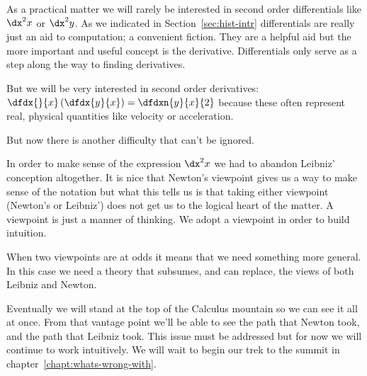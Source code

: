 \begin{Digression}[\foreign{Hic Sunt Dracones} (Here Be Dragons)]



  As a practical matter we will rarely be interested in second order
  differentials like $\dx^2x$ or $\dx^2y$. As we indicated in
  Section~\ref{sec:hist-intr} differentials are really just an aid to
  computation; a convenient fiction. They are a helpful aid but the
  more important and useful concept is the derivative.  Differentials
  only serve as a step along the way to finding derivatives.

  But we will be very interested in second order derivatives:
  $
  \dfdx{}{x}\left(\dfdx{y}{x}\right) = \dfdxn{y}{x}{2}
  $
  because these often represent real, physical quantities like
  velocity or acceleration.
  

  But now there is another difficulty that can't be ignored.

  In order to make sense of the expression $\dx^2{x}$ we had to
  abandon Leibniz' conception altogether. It is nice that Newton's
  viewpoint gives us a way to make sense of the notation but what this
  tells us is that taking either viewpoint (Newton's or Leibniz') does
  not get us to the logical heart of the matter. A viewpoint is just a
  manner of thinking. We adopt a viewpoint in order to build
  intuition.

  When two viewpoints are at odds it means that we need something more
  general. In this case we need a theory that subsumes, and can
  replace, the views of both Leibniz and Newton.

  Eventually we will stand at the top of the Calculus mountain
  so we can see it all at once. From that vantage point we'll be able
  to see the path that Newton took, and the path that Leibniz took.
  This issue must be addressed but for now we will continue to work
  intuitively.  We will wait to begin our trek to the summit in
  chapter~\ref{chapt:whats-wrong-with}. 
\end{Digression}



